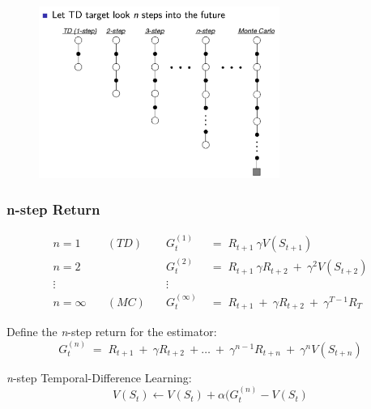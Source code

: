 \documentclass[10pt]{article}
\begin{document}
\begin{figure}[h!]
\includegraphics[width=0.7\textwidth]{pictures/n_step_pred.jpg}
\end{figure}
\subsubsection*{n-step Return}
\begin{align*}
n=1 \quad & (TD) \quad &G_{t}^{(1)} \; &= \; R_{t+1} \:  \gamma V(S_{t+1}) \\
n=2 \quad & \quad \quad &G_{t}^{(2)} \; &= \; R_{t+1} \:  \gamma R_{t+2} \: + \: \gamma^{2} V(S_{t+2}) \\
\vdots \quad &\quad \quad &\vdots & \\
n=\infty \quad & (MC) \quad &G_{t}^{(\infty)} \; &= \; R_{t+1} \: + \:  \gamma R_{t+2} \: + \: \gamma^{T-1} R_{T}
\end{align*}

Define the \textit{n}-step return for the estimator:
\begin{equation}
G_{t}^{(n)} \; = \; R_{t+1} \: + \: \gamma R_{t+2} \: + \ldots \: + \: \gamma^{n-1} R_{t+n} \: + \: \gamma^{n} V(S_{t+n}) 
\end{equation}

\textit{n}-step Temporal-Difference Learning:
\begin{equation}
V(S_{t}) \leftarrow V(S_{t}) + \alpha (G_{t}^{(n)} - V(S_{t})
\end{equation}
\end{document}
